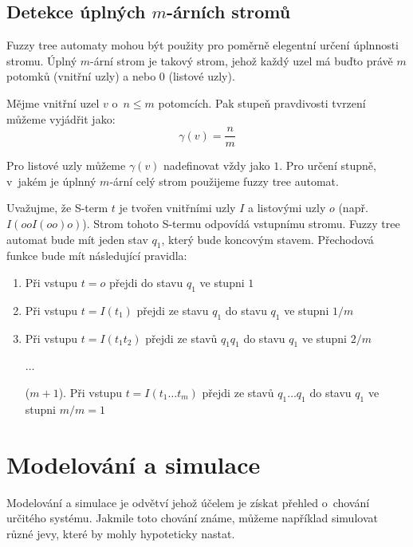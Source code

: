 \subsection{Detekce úplných $m$-árních stromů} \label{subs:DetComTrees}
Fuzzy tree automaty mohou být použity pro poměrně elegentní určení úplnnosti stromu. Úplný $m$-ární strom je takový strom, jehož každý uzel má buďto právě $m$ potomků (vnitřní uzly) a nebo $0$ (listové uzly).

Mějme vnitřní uzel $v$ o~$n \leq m$ potomcích. Pak stupeň pravdivosti tvrzení  můžeme vyjádřit jako:
$$
  \gamma(v) = \frac{n}{m}
$$

Pro listové uzly můžeme $\gamma(v)$ nadefinovat vždy jako $1$. Pro určení stupně, v~jakém je úplnný $m$-ární celý strom použijeme fuzzy tree automat.

Uvažujme, že S-term $t$ je tvořen vnitřními uzly $I$ a listovými uzly $o$ (např. $I(ooI(oo)o)$). Strom tohoto S-termu odpovídá vstupnímu stromu. Fuzzy tree automat bude mít jeden stav $q_1$, který bude koncovým stavem. Přechodová funkce bude mít následující pravidla:
\begin{enumerate}
 \setlength{\itemindent}{2em}
 \item Při vstupu $t = o$ přejdi do stavu $q_1$ ve stupni $1$
 \item Při vstupu $t = I(t_1)$ přejdi ze stavu $q_1$ do stavu $q_1$ ve stupni $1/m$
 \item Při vstupu $t = I(t_1 t_2)$ přejdi ze stavů $q_1 q_1$ do stavu $q_1$ ve stupni $2/m$
 \item[] $\dots$
 \item[($m + 1$).] Při vstupu $t = I(t_1 \dots t_m)$ přejdi ze stavů $q_1 \dots q_1$ do stavu $q_1$ ve stupni $m/m = 1$
\end{enumerate}


\section{Modelování a simulace}

Modelování a simulace je odvětví jehož účelem je získat přehled o~chování určitého systému. Jakmile toto chování známe, můžeme například simulovat různé jevy, které by mohly hypoteticky nastat.

